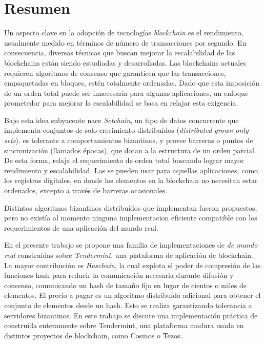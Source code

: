   \chapter*{Resumen}
  Un aspecto clave en la adopción de tecnologías \textit{blockchain} es el rendimiento,
  usualmente medido en términos de número de transacciones por segundo.
  En consecuencia, diversas técnicas que buscan mejorar la escalabilidad de las blockchains
  están siendo estudiadas y desarrolladas.
  Las blockchains actuales requieren algoritmos de consenso que garanticen que las
  transacciones, empaquetadas en bloques, estén totalmente ordenadas.
  Dado que esta imposición de un orden total puede ser innecesaria para algunas aplicaciones,
  un enfoque prometedor para mejorar la escalabilidad se basa en relajar esta exigencia.

  Bajo esta idea subyacente nace \textit{Setchain}, un tipo de
  datos concurrente que implementa conjuntos de solo crecimiento distribuídos 
  (\textit{distributed grown-only sets}).
  \setchain
  es tolerante a comportamientos bizantinos, y provee barreras o puntos de sincronización
  (llamados épocas), que dotan a la estructura de un orden parcial.
  De esta forma, relaja el requerimiento de orden total buscando lograr mayor
  rendimiento y escalabilidad.
  Las \setchains se pueden usar para aquellas aplicaciones, como los registros digitales,
  en donde los elementos en la blockchain no necesitan estar ordenados, excepto a través
  de barreras ocasionales.
  
  
  Distintos algoritmos bizantinos distribuídos que implementan \setchain fueron
  propuestos, pero no existía al momento ninguna implementacion eficiente compatible con
  los requerimientos de una aplicación del mundo real.
  
  En el presente trabajo se propone una familia de implementaciones de \setchain 
  \textit{de mundo real} construídas sobre \textit{Tendermint}, una plataforma de
  aplicación de blockchain.  
  La mayor contribución es \textit{Haschain}, la cual explota el poder de compresión de las
  funciones hash para reducir la comunicación necesaria durante difusión y consenso,
  comunicando un hash de tamaño fijo en lugar de cientos o miles de elementos.
  El precio a pagar es un algoritmo distribuído adicional para obtener el conjunto de
  elementos desde un hash. Esto se realiza garantizando tolerancia a servidores bizantinos.
  En este trabajo se discute una implementación práctica de \hashchain construída enteramente
  sobre Tendermint, una plataforma madura usada en distintos proyectos de blockchain, como
  Cosmos o Tezos.

